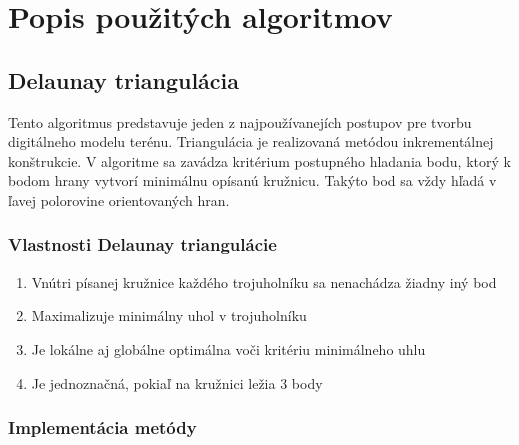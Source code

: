 \documentclass[12pt]{article}
\begin{document}
\clearpage 
\section {Popis použitých algoritmov}
\subsection {Delaunay triangulácia}
Tento algoritmus predstavuje jeden z najpoužívanejích postupov pre tvorbu digitálneho modelu terénu. Triangulácia je realizovaná metódou inkrementálnej konštrukcie. V algoritme sa zavádza kritérium postupného hladania bodu, ktorý k bodom hrany vytvorí minimálnu opísanú kružnicu. Takýto bod sa vždy hľadá v ľavej polorovine orientovaných hran. 

\subsubsection {Vlastnosti Delaunay triangulácie}
\begin{enumerate}
\item Vnútri písanej kružnice každého trojuholníku sa nenachádza žiadny iný bod
\item Maximalizuje minimálny uhol v trojuholníku
\item Je lokálne aj globálne optimálna voči kritériu minimálneho uhlu
\item Je jednoznačná, pokiaľ na kružnici ležia 3 body
\end{enumerate}

\subsubsection{Implementácia metódy}
\end{document}
